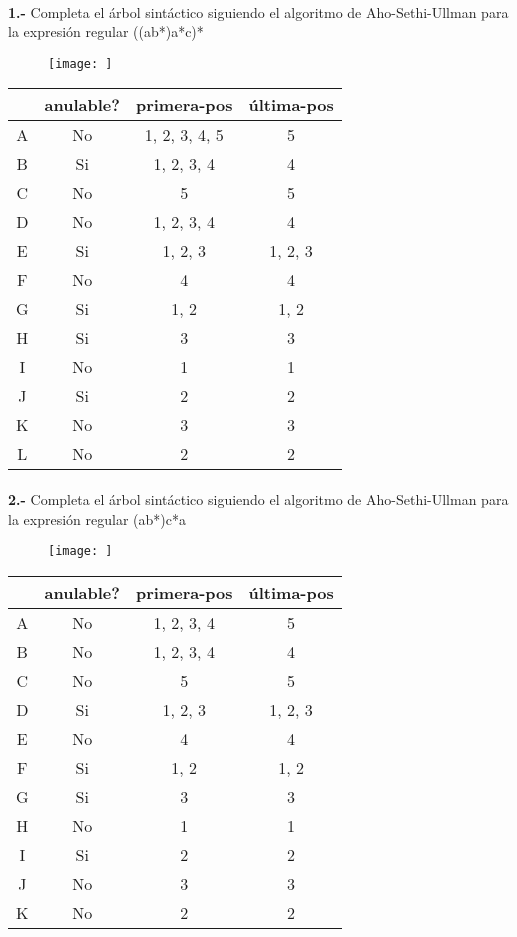 \documentclass[11pt,a4paper]{report}
\begin{document}
\paragraph{}

\paragraph{}
\textbf{1.-} Completa el árbol sintáctico siguiendo el algoritmo de Aho-Sethi-Ullman para la expresión regular ((a\textbar b*)a*c)*
\begin{figure}[ht!]
\centering
\texttt{[image: ]}
\end{figure}

\begin{tabular} {| c | c | c | c |}\hline
 & anulable? & primera-pos & última-pos\\ \hline
A & No & 1, 2, 3, 4, 5 & 5\\ \hline
B & Si & 1, 2, 3, 4 & 4\\ \hline
C & No & 5 & 5\\ \hline
D & No & 1, 2, 3, 4 & 4\\ \hline
E & Si & 1, 2, 3 & 1, 2, 3\\ \hline
F & No & 4 & 4\\ \hline
G & Si & 1, 2 & 1, 2\\ \hline
H & Si & 3 & 3\\ \hline
I & No & 1 & 1\\ \hline
J & Si & 2 & 2\\ \hline
K & No & 3 & 3\\ \hline
L & No & 2 & 2\\ \hline
\end{tabular}\paragraph{}
\textbf{2.-} Completa el árbol sintáctico siguiendo el algoritmo de Aho-Sethi-Ullman para la expresión regular (a\textbar b*)c*a
\begin{figure}[ht!]
\centering
\texttt{[image: ]}
\end{figure}

\begin{tabular} {| c | c | c | c |}\hline
 & anulable? & primera-pos & última-pos\\ \hline
A & No & 1, 2, 3, 4 & 5\\ \hline
B & No & 1, 2, 3, 4 & 4\\ \hline
C & No & 5 & 5\\ \hline
D & Si & 1, 2, 3 & 1, 2, 3\\ \hline
E & No & 4 & 4\\ \hline
F & Si & 1, 2 & 1, 2\\ \hline
G & Si & 3 & 3\\ \hline
H & No & 1 & 1\\ \hline
I & Si & 2 & 2\\ \hline
J & No & 3 & 3\\ \hline
K & No & 2 & 2\\ \hline
\end{tabular}
\end{document}
